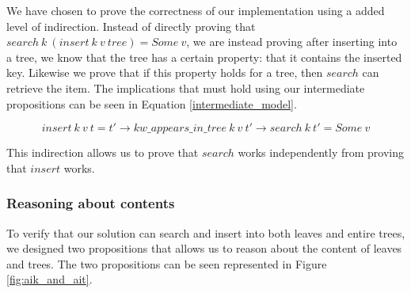 We have chosen to prove the correctness of our implementation using a added level of indirection. Instead of directly proving that $search~k~(insert~k~v~ tree) = Some~v$, we are instead proving after inserting into a tree, we know that the tree has a certain property: that it contains the inserted key. Likewise we prove that if this property holds for a tree, then $search$ can retrieve the item. The implications that must hold using our intermediate propositions can be seen in Equation \ref{intermediate_model}.

\begin{equation}
  insert~k~v~t = t' \rightarrow kw\_appears\_in\_tree~k~v~t' \rightarrow search~k~t' = Some~v
  \label{intermediate_model}
\end{equation}

This indirection allows us to prove that $search$ works independently from proving that $insert$ works.

\subsubsection{Reasoning about contents}
To verify that our solution can search and insert into both leaves and entire trees, we designed two propositions that allows us to reason about the content of leaves and trees. The two propositions can be seen represented in Figure \ref{fig:aik_and_ait}. 

